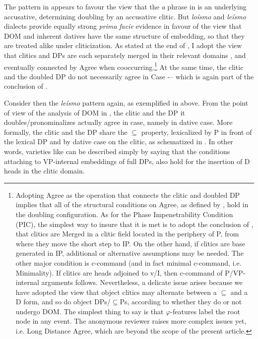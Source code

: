 \documentclass[output=paper,colorlinks,citecolor=brown,nonflat]{./langscibook}
\begin{document}
The pattern in  appears to favour the view that the \textit{a} phrase in  is an underlying accusative, determining doubling by an accusative clitic. But \textit{loísmo} and \textit{leísmo} dialects provide equally strong \textit{prima} \textit{facie} evidence in favour of the view that DOM and inherent datives have the same structure of embedding, so that they are treated alike under cliticization. As stated at the end of , I adopt the view that clitics and DPs are each separately merged in their relevant domains \citep{Sportiche1996}, and eventually connected by  Agree when cooccurring.\footnote{Adopting Agree as the operation that connects the clitic and doubled DP implies that all of the structural conditions on Agree, as defined by \citet{Chomsky2000}, hold in the doubling configuration. As for the Phase Impenetrability Condition (PIC), the simplest way to insure that it is met is to adopt the conclusion of \citet{Sportiche1996}, that clitics are Merged in a clitic field located in the periphery of \liv P, from where they move the short step to IP. On the other hand, if clitics are base generated in IP, additional or alternative assumptions may be needed. The other major condition is c-command (and in fact minimal c-command, i.e. Minimality). If clitics are heads adjoined to v/I, then c-command of \liv P/VP-internal arguments follows. Nevertheless, a delicate issue arises because we have adopted the view that object clitics may alternate between a \textrm{${\subseteq}$} and a D form, and so do object DPs/\textrm{${\subseteq}$}Ps, according to whether they do or not undergo DOM.  The simplest thing to say is that $\varphi $-features label the root node in any event. The anonymous reviewer raises more complex issues yet, i.e. Long Distance Agree, which are beyond the scope of the present article.}{} At the same time, the clitic and the doubled DP do not necessarily agree in Case -– which is again part of the conclusion of .

Consider then the \textit{leísmo} pattern again, as exemplified in  above. From the point of view of the analysis of DOM in , the clitic and the DP it doubles/pronominalizes actually agree in case, namely in dative case. More formally, the clitic and the DP share the ${\subseteq}$ property, lexicalized by P in front of the lexical DP and by dative case on the clitic, as schematized in . In other words, varieties like  can be described simply by saying that the conditions attaching to VP-internal embeddings of full DPs, also hold for the insertion of D heads in the clitic domain.
\end{document}
